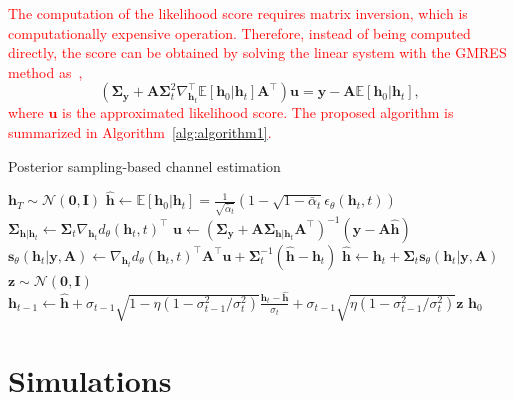 \documentclass[lettersize,journal]{IEEEtran}
\begin{document}
\textcolor{red}{The computation of the likelihood score requires matrix inversion, which is computationally expensive operation. Therefore, instead of being computed directly, the score can be obtained by solving the linear system with the GMRES method as~\cite{saadGMRESGeneralizedMinimal1986},}
\begin{equation}
(\boldsymbol{\Sigma}_{\mathbf{y}}+\mathbf{A}\boldsymbol{\Sigma}_{t}^{2}\nabla_{\mathbf{h}_{t}}^{\top}\mathbb{E}[\mathbf{h}_{0}|\mathbf{h}_{t}]\mathbf{A}^{\top})\mathbf{u} = \mathbf{y}- \mathbf{A}\mathbb{E}[\mathbf{h}_{0}|\mathbf{h}_{t}],
\end{equation}
\textcolor{red}{
where $\mathbf{u}$ is the approximated likelihood score. The proposed algorithm is summarized in Algorithm~\ref{alg:algorithm1}.
}

\begin{algorithm}[!t]
\caption{Posterior sampling-based channel estimation}
\label{alg:algorithm1}
\begin{algorithmic}[1]
\STATE $\mathbf{h}_T \sim \mathcal{N}(\mathbf{0}, \mathbf{I})$
	\STATE $\hat{\mathbf{h}} \gets \mathbb{E}[\mathbf{h}_{0}|\mathbf{h}_{t}] = \frac{1}{\sqrt{ \bar{\alpha}_{t} }}(1-\sqrt{ 1-\bar{\alpha}_{t} }\epsilon_{\theta}(\mathbf{h}_{t},t))$
	\STATE $\boldsymbol{\Sigma}_{\mathbf{h}|\mathbf{h}_{t}} \gets \boldsymbol{\Sigma}_{t} \nabla_{\mathbf{h}_{t}}d_{\theta}(\mathbf{h}_{t},t)^{\top}$
	\STATE $\mathbf{u} \gets (\boldsymbol{\Sigma}_{\mathbf{y}}+\mathbf{A}\boldsymbol{\Sigma}_{\mathbf{h}|\mathbf{h}_{t}}\mathbf{A}^{\top})^{-1}(\mathbf{y}-\mathbf{A}\hat{\mathbf{h}})$
	\STATE $\mathbf{s}_{\theta}(\mathbf{h}_{t}|\mathbf{y},\mathbf{A}) \gets \nabla_{\mathbf{h}_{t}}d_{\theta}(\mathbf{h}_{t},t)^{\top}\mathbf{A}^{\top}\mathbf{u} + \boldsymbol{\Sigma}_{t}^{-1}(\hat{\mathbf{h}}-\mathbf{h}_{t})$
	\STATE $\hat{\mathbf{h}} \gets \mathbf{h}_{t} + \boldsymbol{\Sigma}_{t}\mathbf{s}_{\theta}(\mathbf{h}_{t}|\mathbf{y},\mathbf{A})$
	\STATE $\mathbf{z}\sim\mathcal{N}(\mathbf{0},\mathbf{I})$
	\STATE $\mathbf{h}_{t-1} \gets \hat{\mathbf{h}} + \sigma_{t-1}\sqrt{ 1-\eta( 1- \sigma_{t-1}^{2} /\sigma_{t}^{2} ) }\frac{\mathbf{h}_{t}-\hat{\mathbf{h}}}{\sigma_{t}} + \sigma_{t-1}\sqrt{ \eta( 1- \sigma_{t-1}^{2} / \sigma_{t}^{2}) }\mathbf{z}$
\ENDFOR
\RETURN $\mathbf{h}_{0}$
\end{algorithmic}
\end{algorithm}

\section{Simulations}
\end{document}
